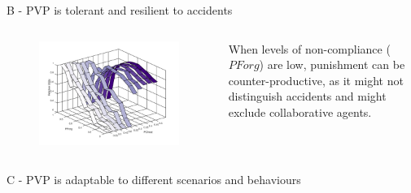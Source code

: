 \documentclass[xcolor={table}]{beamer}
\begin{document}
\begin{frame}[fragile=singleslide,t]
\begin{columns}[T]
\begin{column}{.47\textwidth}
\begin{block}{B - PVP is tolerant and resilient to accidents}
\begin{columns}[T]
\begin{column}{.7\textwidth}
\begin{figure}
  \centering
  \includegraphics[width=1.0\linewidth]{img/exp1b.png}%
    \label{respforg}
  \end{figure}

\end{column}
\begin{column}{.3\textwidth}


When levels of non-compliance ($PForg$) are low, punishment can be counter-productive, as it might not distinguish accidents and might exclude collaborative agents.


\end{column}
\end{columns}
\end{block}


\begin{block}{C - PVP is adaptable to different scenarios and behaviours}

\begin{columns}[c]
\begin{column}{.7\textwidth}


\end{column}
\end{columns}
\end{block}
\end{column}
\end{columns}
\end{frame}
\end{document}
